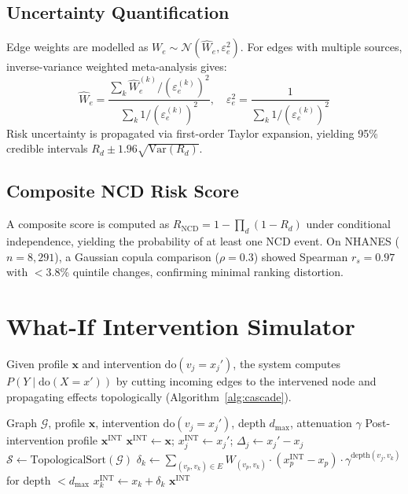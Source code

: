 \documentclass[runningheads]{llncs}
\begin{document}
\subsection{Uncertainty Quantification}\label{sec:uncert}

Edge weights are modelled as $W_e \sim \mathcal{N}(\hat{W}_e,
\varepsilon_e^2)$.
For edges with multiple sources, inverse-variance weighted
meta-analysis gives:
\begin{equation}\label{eq:meta}
\hat{W}_e = \frac{\sum_k \hat{W}_e^{(k)} / (\varepsilon_e^{(k)})^2}
{\sum_k 1 / (\varepsilon_e^{(k)})^2}, \quad
\varepsilon_e^2 = \frac{1}{\sum_k 1 / (\varepsilon_e^{(k)})^2}
\end{equation}
Risk uncertainty is propagated via first-order Taylor expansion,
yielding 95\% credible intervals $R_d \pm 1.96\sqrt{\mathrm{Var}(R_d)}$.

\subsection{Composite NCD Risk Score}\label{sec:composite}

A composite score is computed as
$R_{\mathrm{NCD}} = 1 - \prod_{d} (1 - R_d)$
under conditional independence, yielding the probability of at least
one NCD event.
On NHANES ($n = 8{,}291$), a Gaussian copula comparison
($\rho = 0.3$) showed Spearman $r_s = 0.97$ with $<$3.8\%
quintile changes, confirming minimal ranking distortion.

\section{What-If Intervention Simulator}\label{sec:whatif}

Given profile $\mathbf{x}$ and intervention
$\mathrm{do}(v_j = x_j')$, the system computes
$P(Y \mid \mathrm{do}(X = x'))$ by cutting incoming edges to the
intervened node and propagating effects topologically
(Algorithm~\ref{alg:cascade}).

\begin{algorithm}[t]
\caption{Topological Intervention Cascade}
\label{alg:cascade}
\begin{algorithmic}[1]
\REQUIRE Graph $\mathcal{G}$, profile $\mathbf{x}$, intervention
  $\mathrm{do}(v_j = x_j')$, depth $d_{\max}$, attenuation $\gamma$
\ENSURE Post-intervention profile $\mathbf{x}^{\mathrm{INT}}$
\STATE $\mathbf{x}^{\mathrm{INT}} \leftarrow \mathbf{x}$;
  $x_j^{\mathrm{INT}} \leftarrow x_j'$;
  $\Delta_j \leftarrow x_j' - x_j$
\STATE $\mathcal{S} \leftarrow \text{TopologicalSort}(\mathcal{G})$
  \STATE $\delta_k \leftarrow \sum_{(v_p, v_k) \in E} W_{(v_p,v_k)} \cdot (x_p^{\mathrm{INT}} - x_p) \cdot \gamma^{\text{depth}(v_j,v_k)}$ for depth $< d_{\max}$
  \STATE $x_k^{\mathrm{INT}} \leftarrow x_k + \delta_k$
\ENDFOR
\RETURN $\mathbf{x}^{\mathrm{INT}}$
\end{algorithmic}
\end{algorithm}
\end{document}
